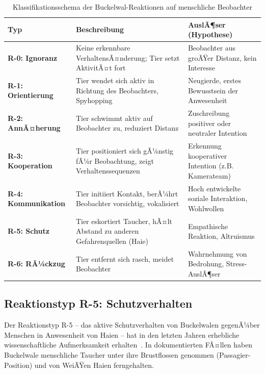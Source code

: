 ﻿\documentclass[12pt,a4paper]{article}
\theoremstyle{definition}
\theoremstyle{remark}
\begin{document}
\begin{table}[h]
  \centering
  \caption{Klassifikationsschema der Buckelwal-Reaktionen auf menschliche Beobachter}
  \label{tab:reaktionen}
  \begin{tabularx}{\textwidth}{p{2.5cm}Xp{3.5cm}}
    \toprule
    \textbf{Typ} & \textbf{Beschreibung} & \textbf{AuslÃ¶ser (Hypothese)} \\
    \midrule
    \textbf{R-0: Ignoranz} & Keine erkennbare VerhaltensÃ¤nderung; Tier setzt
    AktivitÃ¤t fort & Beobachter aus groÃŸer Distanz, kein Interesse \\[4pt]
    \textbf{R-1: Orientierung} & Tier wendet sich aktiv in Richtung des
    Beobachters, Spyhopping & Neugierde, erstes Bewusstsein der Anwesenheit \\[4pt]
    \textbf{R-2: AnnÃ¤herung} & Tier schwimmt aktiv auf Beobachter zu,
    reduziert Distanz & Zuschreibung positiver oder neutraler Intention \\[4pt]
    \textbf{R-3: Kooperation} & Tier positioniert sich gÃ¼nstig fÃ¼r Beobachtung,
    zeigt Verhaltenssequenzen & Erkennung kooperativer Intention (z.B. Kamerateam) \\[4pt]
    \textbf{R-4: Kommunikation} & Tier initiiert Kontakt, berÃ¼hrt Beobachter
    vorsichtig, vokalisiert & Hoch entwickelte soziale Interaktion, Wohlwollen \\[4pt]
    \textbf{R-5: Schutz} & Tier eskortiert Taucher, hÃ¤lt Abstand zu anderen
    Gefahrenquellen (Haie) & Empathische Reaktion, Altruismus \\[4pt]
    \textbf{R-6: RÃ¼ckzug} & Tier entfernt sich rasch, meidet Beobachter & Wahrnehmung
    von Bedrohung, Stress-AuslÃ¶ser \\
    \bottomrule
  \end{tabularx}
\end{table}

\subsection{Reaktionstyp R-5: Schutzverhalten}

Der Reaktionstyp R-5 -- das aktive Schutzverhalten von Buckelwalen gegenÃ¼ber
Menschen in Anwesenheit von Haien -- hat in den letzten Jahren erhebliche
wissenschaftliche Aufmerksamkeit erhalten~\cite{pitman2017humpback}. In
dokumentierten FÃ¤llen haben Buckelwale menschliche Taucher unter ihre
Brustflossen genommen (Passagier-Position) und von WeiÃŸen Haien
ferngehalten.
\end{document}
